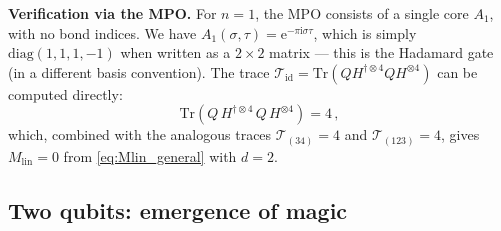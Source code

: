 \documentclass[11pt,a4paper]{article}
\theoremstyle{definition}
\theoremstyle{remark}
\newcommand{\Mlin}{M_{\mathrm{lin}}}
\renewcommand{\Tr}{\mathrm{Tr}}
\newcommand{\ee}{\mathrm{e}}
\newcommand{\ii}{\mathrm{i}}
\begin{document}
\textbf{Verification via the MPO.} For $n=1$, the MPO consists of a single core $A_1$, with no bond indices. We have $A_1(\sigma,\tau) = \ee^{-\pi\ii\sigma\tau}$, which is simply $\text{diag}(1, 1, 1, -1)$ when written as a $2\times2$ matrix --- this is the Hadamard gate (in a different basis convention). The trace $\mathcal{T}_{\mathrm{id}} = \Tr(Q H^{\dagger\otimes 4} Q H^{\otimes 4})$ can be computed directly:
\begin{equation}
  \Tr(Q\,H^{\dagger\otimes 4}\,Q\,H^{\otimes 4}) = 4\,,
\end{equation}
which, combined with the analogous traces $\mathcal{T}_{(34)} = 4$ and $\mathcal{T}_{(123)}=4$, gives $\Mlin = 0$ from \eqref{eq:Mlin_general} with $d=2$.

\subsection{Two qubits: emergence of magic}
\label{sec:two_qubits}
\end{document}
